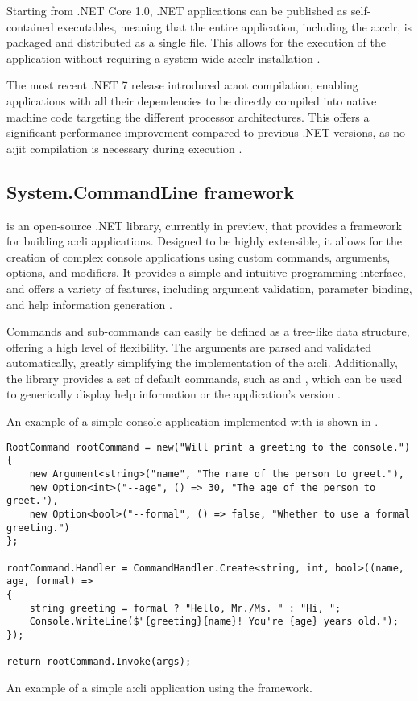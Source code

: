 Starting from .NET Core 1.0, .NET applications can be published as self-contained executables, meaning that the entire application, including the \gls{a:cclr}, is packaged and distributed as a single file. This allows for the execution of the application without requiring a system-wide \gls{a:cclr} installation \cite{DotnetPublishing}.

The most recent .NET 7 release introduced \gls{a:aot} compilation, enabling applications with all their dependencies to be directly compiled into native machine code targeting the different processor architectures. This offers a significant performance improvement compared to previous .NET versions, as no \gls{a:jit} compilation is necessary during execution \cite{DotnetPublishingAot}.

\subsection{System.CommandLine framework}

 is an open-source .NET library, currently in preview, that provides a framework for building \gls{a:cli} applications. Designed to be highly extensible, it allows for the creation of complex console applications using custom commands, arguments, options, and modifiers. It provides a simple and intuitive programming interface, and offers a variety of features, including argument validation, parameter binding, and help information generation \cite{DotnetSystemCommandline}\cite{DotnetSystemCommandlineGetStarted}.

Commands and sub-commands can easily be defined as a tree-like data structure, offering a high level of flexibility. The arguments are parsed and validated automatically, greatly simplifying the implementation of the \gls{a:cli}. Additionally, the library provides a set of default commands, such as  and , which can be used to generically display help information or the application's version \cite{DotnetSystemCommandlineGetStarted}. 

An example of a simple console application implemented with  is shown in .

\begin{listing}[H]
\begin{verbatim}
RootCommand rootCommand = new("Will print a greeting to the console.")
{
    new Argument<string>("name", "The name of the person to greet."),
    new Option<int>("--age", () => 30, "The age of the person to greet."),
    new Option<bool>("--formal", () => false, "Whether to use a formal greeting.")
};

rootCommand.Handler = CommandHandler.Create<string, int, bool>((name, age, formal) =>
{
    string greeting = formal ? "Hello, Mr./Ms. " : "Hi, ";
    Console.WriteLine($"{greeting}{name}! You're {age} years old.");
});

return rootCommand.Invoke(args);
\end{verbatim}
\caption{An example of a simple \gls{a:cli} application using the  framework.}
\label{lst:cli-example}
\end{listing}

